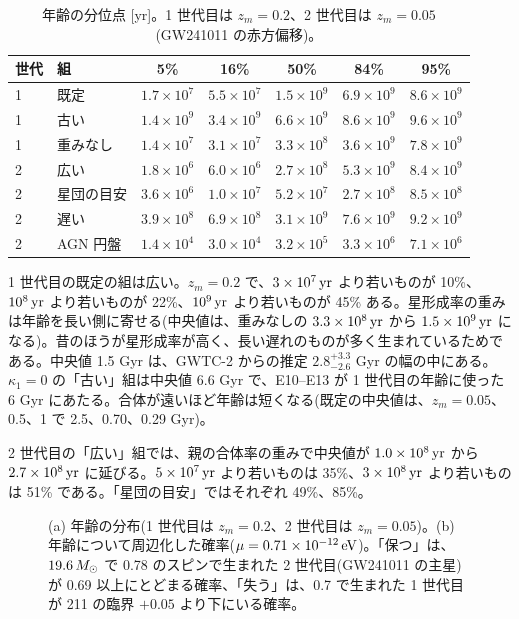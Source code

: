 \begin{table}[H]
\centering\small
\begin{tabular}{llccccc}
\toprule
世代 & 組 & 5\% & 16\% & 50\% & 84\% & 95\%\\
\midrule
1 & 既定 & $1.7\times10^7$ & $5.5\times10^7$ & $1.5\times10^9$ & $6.9\times10^9$ & $8.6\times10^9$\\
1 & 古い & $1.4\times10^9$ & $3.4\times10^9$ & $6.6\times10^9$ & $8.6\times10^9$ & $9.6\times10^9$\\
1 & 重みなし & $1.4\times10^7$ & $3.1\times10^7$ & $3.3\times10^8$ & $3.6\times10^9$ & $7.8\times10^9$\\
\midrule
2 & 広い & $1.8\times10^6$ & $6.0\times10^6$ & $2.7\times10^8$ & $5.3\times10^9$ & $8.4\times10^9$\\
2 & 星団の目安 & $3.6\times10^6$ & $1.0\times10^7$ & $5.2\times10^7$ & $2.7\times10^8$ & $8.5\times10^8$\\
2 & 遅い & $3.9\times10^8$ & $6.9\times10^8$ & $3.1\times10^9$ & $7.6\times10^9$ & $9.2\times10^9$\\
2 & AGN 円盤 & $1.4\times10^4$ & $3.0\times10^4$ & $3.2\times10^5$ & $3.3\times10^6$ & $7.1\times10^6$\\
\bottomrule
\end{tabular}
\caption{年齢の分位点 [yr]。1 世代目は $z_m=0.2$、2 世代目は $z_m=0.05$(GW241011 の赤方偏移)。}
\label{tab:e22q}
\end{table}

1 世代目の既定の組は広い。$z_m=0.2$ で、$3\times10^7\,\mathrm{yr}$ より若いものが 10\%、$10^8\,\mathrm{yr}$ より若いものが 22\%、$10^9\,\mathrm{yr}$ より若いものが 45\% ある。星形成率の重みは年齢を長い側に寄せる(中央値は、重みなしの $3.3\times10^8\,\mathrm{yr}$ から $1.5\times10^9\,\mathrm{yr}$ になる)。昔のほうが星形成率が高く、長い遅れのものが多く生まれているためである。中央値 1.5 Gyr は、GWTC-2 からの推定 $2.8^{+3.3}_{-2.6}$ Gyr の幅の中にある。$\kappa_1=0$ の「古い」組は中央値 6.6 Gyr で、E10--E13 が 1 世代目の年齢に使った 6 Gyr にあたる。合体が遠いほど年齢は短くなる(既定の中央値は、$z_m=0.05$、0.5、1 で 2.5、0.70、0.29 Gyr)。

2 世代目の「広い」組では、親の合体率の重みで中央値が $1.0\times10^8\,\mathrm{yr}$ から $2.7\times10^8\,\mathrm{yr}$ に延びる。$5\times10^7\,\mathrm{yr}$ より若いものは 35\%、$3\times10^8\,\mathrm{yr}$ より若いものは 51\% である。「星団の目安」ではそれぞれ 49\%、85\%。

\begin{figure}[H]
\centering

\caption{(a) 年齢の分布(1 世代目は $z_m=0.2$、2 世代目は $z_m=0.05$)。(b) 年齢について周辺化した確率($\mu=0.71\times10^{-12}\,\mathrm{eV}$)。「保つ」は、$19.6\,M_\odot$ で 0.78 のスピンで生まれた 2 世代目(GW241011 の主星)が 0.69 以上にとどまる確率、「失う」は、0.7 で生まれた 1 世代目が 211 の臨界 $+0.05$ より下にいる確率。}
\label{fig:e22}
\end{figure}

